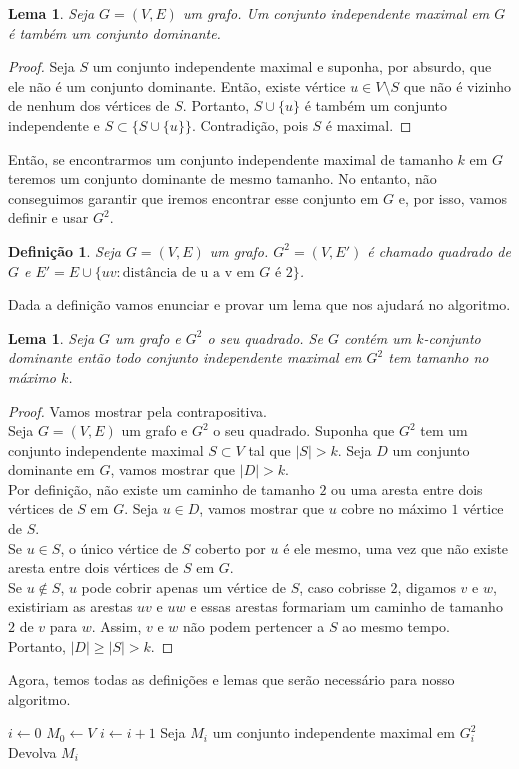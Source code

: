\documentclass[12pt]{article}
\newtheorem{lemma}[theorem]{Lema}
\newtheorem{definition}[theorem]{Definição}
\begin{document}
\begin{lemma}
    Seja $G = (V,E)$ um grafo. Um conjunto independente maximal em $G$ é também um conjunto dominante.
\end{lemma}
\begin{proof}
    Seja $S$ um conjunto independente maximal e suponha, por absurdo, que ele não é um conjunto dominante. Então, existe vértice $u \in V \setminus S$ que não é vizinho de nenhum dos vértices de $S$. Portanto, $S \cup \{u\}$ é também um conjunto independente e $S \subset \{S \cup \{u\}\}$. Contradição, pois $S$ é maximal.
\end{proof}
Então, se encontrarmos um conjunto independente maximal de tamanho $k$ em $G$ teremos um conjunto dominante de mesmo tamanho. No entanto, não conseguimos garantir que iremos encontrar esse conjunto em $G$ e, por isso, vamos definir e usar $G^2$.
\begin{definition}
    Seja $G= (V,E)$ um grafo. $G^2 = (V,E')$ é chamado \emph{quadrado} de $G$ e $E' = E \cup \{uv: \text{distância de u a v em $G$ é $2$}\}$.
\end{definition}
Dada a definição vamos enunciar e provar um lema que nos ajudará no algoritmo.
\begin{lemma}\label{lemma:2.9}
    Seja $G$ um grafo e $G^2$ o seu quadrado. Se $G$ contém um $k$-conjunto dominante então todo conjunto independente maximal em $G^2$ tem tamanho no máximo $k$.
\end{lemma}
\begin{proof}
    Vamos mostrar pela contrapositiva.\\
    Seja $G = (V,E)$ um grafo e $G^2$ o seu quadrado. Suponha que $G^2$ tem um conjunto independente maximal $S \subset V$ tal que $|S| > k$. Seja $D$ um conjunto dominante em $G$, vamos mostrar que $|D| > k$. \\
    Por definição, não existe um caminho de tamanho $2$ ou uma aresta entre dois vértices de $S$ em $G$. Seja $u \in D$, vamos mostrar que $u$ cobre no máximo $1$ vértice de $S$. \\Se $u \in S$, o único vértice de $S$ coberto por $u$ é ele mesmo, uma vez que não existe aresta entre dois vértices de $S$ em $G$. \\
    Se $u \not \in S$, $u$ pode cobrir apenas um vértice de $S$, caso cobrisse $2$, digamos $v$ e $w$, existiriam as arestas $uv$ e $uw$ e essas arestas formariam um caminho de tamanho $2$ de $v$ para $w$. Assim, $v$ e $w$ não podem pertencer a $S$ ao mesmo tempo. \\
    Portanto, $|D| \geq |S| > k$.
\end{proof}
Agora, temos todas as definições e lemas que serão necessário para nosso algoritmo.
\begin{algorithm}
    \begin{algorithmic}[1]
        \State $i \leftarrow 0$
        \State $M_0 \leftarrow V$
            \State $i\leftarrow i + 1$
            \State Seja $M_i$ um conjunto independente maximal em $G_i^2$
        \EndWhile
        \State Devolva $M_i$
        \EndFunction
    \end{algorithmic}
\end{algorithm}
\end{document}
